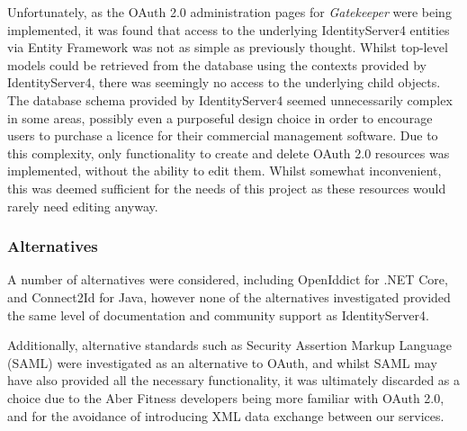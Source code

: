 Unfortunately, as the OAuth 2.0 administration pages for \textit{Gatekeeper} were being implemented, it was found that access to the underlying IdentityServer4 entities via Entity Framework was not as simple as previously thought. Whilst top-level models could be retrieved from the database using the contexts provided by IdentityServer4, there was seemingly no access to the underlying child objects. The database schema provided by IdentityServer4 seemed unnecessarily complex in some areas, possibly even a purposeful design choice in order to encourage users to purchase a licence for their commercial management software\cite{identityserver4adminui}. Due to this complexity,  only functionality to create and delete OAuth 2.0 resources was implemented, without the ability to edit them. Whilst somewhat inconvenient, this was deemed sufficient for the needs of this project as these resources would rarely need editing anyway.

\subsubsection{Alternatives}

A number of alternatives were considered, including OpenIddict\cite{openiddict} for .NET Core, and Connect2Id\cite{connect2id} for Java, however none of the alternatives investigated provided the same level of documentation and community support as IdentityServer4.

Additionally, alternative standards such as Security Assertion Markup Language (SAML) were investigated as an alternative to OAuth, and whilst SAML may have also provided all the necessary functionality, it was ultimately discarded as a choice due to the Aber Fitness developers being more familiar with OAuth 2.0, and for the avoidance of introducing XML data exchange between our services.
